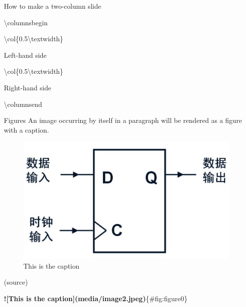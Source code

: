 \documentclass[
  10pt,
  ignorenonframetext,
  serif,onlymath]{beamer}
\newenvironment{Shaded}{}{}
\newcommand{\AlertTok}[1]{\textcolor[rgb]{1.00,0.00,0.00}{\textbf{#1}}}
\newcommand{\NormalTok}[1]{#1}
\begin{document}
\begin{frame}[fragile]{How to make a two-column slide}
\label{how-to-make-a-two-column-slide}
\begin{Shaded}
\begin{Highlighting}[]
\NormalTok{\textbackslash{}columnsbegin}

\NormalTok{\textbackslash{}col\{0.5\textbackslash{}textwidth\}}

\NormalTok{  Left{-}hand side}

\NormalTok{\textbackslash{}col\{0.5\textbackslash{}textwidth\}}

\NormalTok{  Right{-}hand side}

\NormalTok{\textbackslash{}columnsend}
\end{Highlighting}
\end{Shaded}
\end{frame}

\begin{frame}[fragile]{Figures}
\label{figures}
An image occurring by itself in a paragraph will be rendered as a figure
with a caption.

\begin{figure}
\centering
\includegraphics{media/image2.jpeg}
\caption{This is the caption}\label{fig:figure0}
\end{figure}

(source)

\begin{Shaded}
\begin{Highlighting}[]
\AlertTok{![This is the caption](media/image2.jpeg)}\NormalTok{\{\#fig:figure0\}}
\end{Highlighting}
\end{Shaded}
\end{frame}
\end{document}
